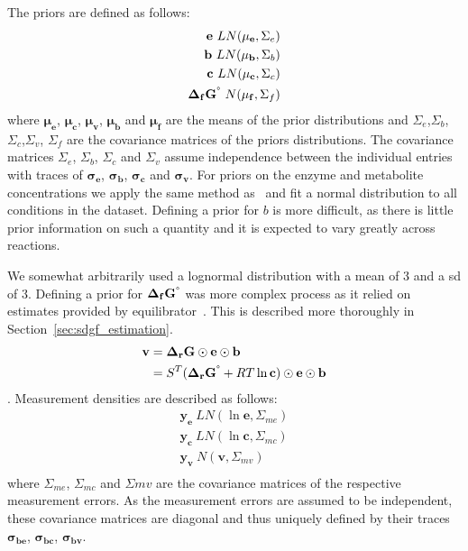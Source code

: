 \documentclass[10pt,letterpaper]{article}
\newcommand{\sdgf}{\Delta_fG^{\degree}}
\newcommand{\dgr}{\Delta_rG}
\newcommand{\sdgr}{\Delta_rG^{\degree}}
\newcommand{\bsdgf}{\mathbf{\sdgf}}
\newcommand{\bdgr}{\mathbf{\dgr}}
\newcommand{\bsdgr}{\mathbf{\sdgr}}
\newcommand{\be}{\mathbf{e}}
\newcommand{\bc}{\mathbf{c}}
\newcommand{\bb}{\mathbf{b}}
\newcommand{\bv}{\mathbf{v}}
\begin{document}
The priors are defined as follows:
\begin{align*}
    \be ~ LN(\mathbf{\mu_e}, \Sigma_e) \\
    \bb ~ LN(\mathbf{\mu_b}, \Sigma_b) \\
    \bc ~ LN(\mathbf{\mu_c}, \Sigma_c) \\
    \bsdgf ~ N(\mathbf{\mu_{f}}, \Sigma_{f}) \\
\end{align*}
where $\mathbf{\mu_e}$, $\mathbf{\mu_c}$, $\mathbf{\mu_v}$, $\mathbf{\mu_b}$ and $\mathbf{\mu_f}$ are the means of the prior distributions and $\Sigma_e$,$\Sigma_b$, $\Sigma_c$,$\Sigma_v$, $\Sigma_f$ are the covariance matrices of the priors distributions.
The covariance matrices $\Sigma_e$, $\Sigma_b$, $\Sigma_c$ and $\Sigma_v$ assume independence between the individual entries with traces of $\mathbf{\sigma_e}$, $\mathbf{\sigma_b}$, $\mathbf{\sigma_c}$ and $\mathbf{\sigma_v}$.
For priors on the enzyme and metabolite concentrations we apply the same method as~\cite{PTA} and fit a normal distribution to all conditions in the dataset. %
Defining a prior for $b$ is more difficult, as there is little prior information on such a quantity and it is expected to vary greatly across reactions.

We somewhat arbitrarily used a lognormal distribution with a mean of 3 and a sd of 3.
Defining a prior for $\bsdgf$ was more complex process as it relied on estimates provided by equilibrator~\cite{noor_2013_equilibrator}.
This is described more thoroughly in Section~\ref{sec:sdgf_estimation}.
\begin{align}
    \bv &= \bdgr \odot \be \odot \bb \\
        &= S^T (\bsdgr + RT\ln{\bc}) \odot \be \odot \bb \\
\end{align}
.
Measurement densities are described as follows:
\begin{align*}
    \mathbf{y_{e}} ~ LN(\ln{\be}, \Sigma_{me}) \\
    \mathbf{y_{c}} ~ LN(\ln{\bc}, \Sigma_{mc}) \\
    \mathbf{y_{v}} ~ N(\bv, \Sigma_{mv}) \\
\end{align*}
where $\Sigma_{me}$, $\Sigma_{mc}$ and $\Sigma{mv}$ are the covariance matrices of the respective measurement errors.
As the measurement errors are assumed to be independent, these covariance matrices are diagonal and thus uniquely defined by their traces $\mathbf{\sigma_{be}}$, $\mathbf{\sigma_{bc}}$, $\mathbf{\sigma_{bv}}$.
\end{document}
